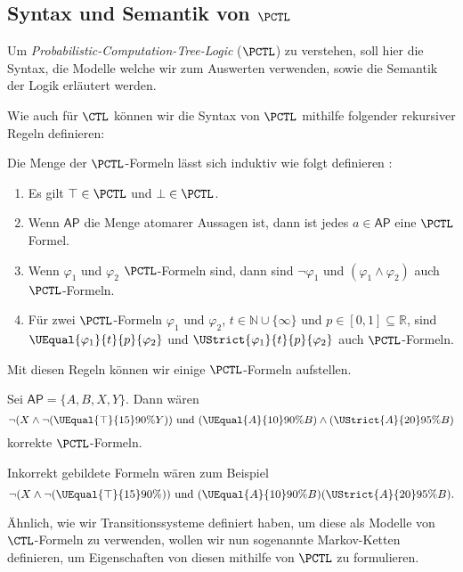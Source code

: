 \subsection{Syntax und Semantik von $\PCTL$}

Um \textit{Probabilistic-Computation-Tree-Logic} ($\PCTL$) zu verstehen, soll hier die Syntax, die Modelle welche wir zum Auswerten verwenden, sowie die Semantik der Logik erläutert werden.

Wie auch für $\CTL$ können wir die Syntax von  $\PCTL$ mithilfe folgender rekursiver Regeln definieren:
\begin{definition}
	\label{SyntaxPCTL}
	Die Menge der $\PCTL$-Formeln lässt sich induktiv wie folgt definieren \cite{hansson1994logic}:
	\begin{enumerate}
		\item Es gilt $\top\in \PCTL$ und $\bot\in \PCTL$.
		\item Wenn $\mathsf{AP}$ die Menge atomarer Aussagen ist, dann ist jedes $a\in \mathsf{AP}$ eine $\PCTL$ Formel.
		\item Wenn $\varphi_1$ und $\varphi_2$ $\PCTL$-Formeln sind, dann sind $\neg\varphi_1$ und $(\varphi_1\land \varphi_2)$ auch $\PCTL$-Formeln.
		\item Für zwei $\PCTL$-Formeln $\varphi_1$ und $\varphi_2$, $t\in \mathbb{N}\cup\{\infty\}$ und $p\in [0,1]\subseteq\mathbb{R}$, sind $\UEqual{\varphi_1}{t}{p}{\varphi_2}$ und $\UStrict{\varphi_1}{t}{p}{\varphi_2}$ auch $\PCTL$-Formeln.
	\end{enumerate}
\end{definition}
Mit diesen Regeln können wir einige $\PCTL$-Formeln aufstellen.
\begin{example}
	\label{ExampleSyntax}
	Sei $\mathsf{AP}=\{A,B,X,Y\}$. Dann wären 
	$$\neg(X \land \neg(\UEqual{\top}{15}{90\%}{Y})) \text{ und } (\UEqual{A}{10}{90\%}{B}) \land (\UStrict{A}{20}{95\%}{B})$$ 
	korrekte $\PCTL$-Formeln.
	
	Inkorrekt gebildete Formeln wären zum Beispiel $$\neg(X \land \neg(\UEqual{\top}{15}{90\%}{})) \text{ und } (\UEqual{A}{10}{90\%}{B})(\UStrict{A}{20}{95\%}{B}).$$
\end{example}

Ähnlich, wie wir Transitionssysteme definiert haben, um diese als Modelle von $\CTL$-Formeln zu verwenden, wollen wir nun sogenannte Markov-Ketten definieren, um Eigenschaften von diesen mithilfe von $\PCTL$ zu formulieren.


